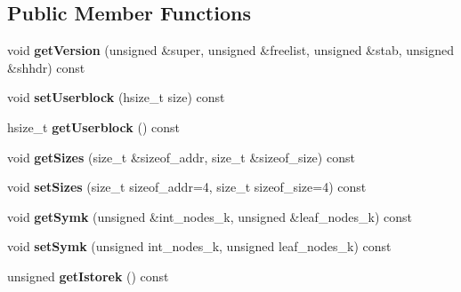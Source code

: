 \subsection*{Public Member Functions}
\begin{DoxyCompactItemize}
\item 
\mbox{\label{class_h5_1_1_file_creat_prop_list_a9425a6733afd9b92e48081d88d69c266}} 
void {\bfseries get\+Version} (unsigned \&super, unsigned \&freelist, unsigned \&stab, unsigned \&shhdr) const
\item 
\mbox{\label{class_h5_1_1_file_creat_prop_list_a10c019e904c9f6711a5cd329c8241fb7}} 
void {\bfseries set\+Userblock} (hsize\+\_\+t size) const
\item 
\mbox{\label{class_h5_1_1_file_creat_prop_list_a2bae11df6210d3ece7764496de218b7f}} 
hsize\+\_\+t {\bfseries get\+Userblock} () const
\item 
\mbox{\label{class_h5_1_1_file_creat_prop_list_a446d9692fa76ec20092538b8c432c29d}} 
void {\bfseries get\+Sizes} (size\+\_\+t \&sizeof\+\_\+addr, size\+\_\+t \&sizeof\+\_\+size) const
\item 
\mbox{\label{class_h5_1_1_file_creat_prop_list_a31c6772abfcd5aa5d89504fb55ad6604}} 
void {\bfseries set\+Sizes} (size\+\_\+t sizeof\+\_\+addr=4, size\+\_\+t sizeof\+\_\+size=4) const
\item 
\mbox{\label{class_h5_1_1_file_creat_prop_list_a9ba5a77338151c09146ea2b1c0e2d0ee}} 
void {\bfseries get\+Symk} (unsigned \&int\+\_\+nodes\+\_\+k, unsigned \&leaf\+\_\+nodes\+\_\+k) const
\item 
\mbox{\label{class_h5_1_1_file_creat_prop_list_a920c10c036827a7a815133fe648097ae}} 
void {\bfseries set\+Symk} (unsigned int\+\_\+nodes\+\_\+k, unsigned leaf\+\_\+nodes\+\_\+k) const
\item 
\mbox{\label{class_h5_1_1_file_creat_prop_list_ae1036509e3817523e0fdb8b14bb11d81}} 
unsigned {\bfseries get\+Istorek} () const

\end{DoxyCompactItemize}
